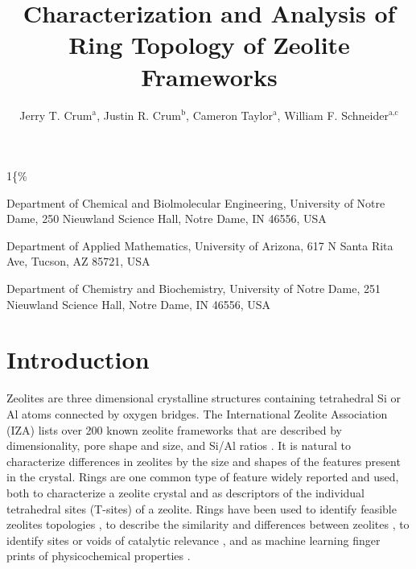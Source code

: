 \documentclass[11pt]{article}
\author{Jerry T. Crum\(^{\text{a}}\), Justin R. Crum\(^{\text{b}}\), Cameron Taylor\(^{\text{a}}\), William F. Schneider\(^{\text{a,c}}\)}
\date{}
\title{Characterization and Analysis of Ring Topology of Zeolite Frameworks}
\begin{document}
\begin{OPTIONS}
\def\udesoftecoverride\#1\mainmatter\{\%
  \AfterEndPreamble{#1\mainmatter}
\end{OPTIONS}

\maketitle

\begin{asparaenum}[\expandafter\textsuperscript a ]
\item Department of Chemical and Biolmolecular Engineering, University of Notre Dame, 250 Nieuwland Science Hall, Notre Dame, IN 46556, USA \\
\item Department of Applied Mathematics, University of Arizona, 617 N Santa Rita Ave, Tucson, AZ 85721, USA\\
\item Department of Chemistry and Biochemistry, University of Notre Dame, 251 Nieuwland Science Hall, Notre Dame, IN 46556, USA
\end{asparaenum}

\newpage

\section{Introduction}
\label{sec:orgb31d910}
Zeolites are three dimensional crystalline structures containing tetrahedral Si or Al atoms connected by oxygen bridges. The International Zeolite Association (IZA) lists over 200 known zeolite frameworks that are described by dimensionality, pore shape and size, and Si/Al ratios \cite{baerlocher-database-nodate}. It is natural to characterize differences in zeolites by the size and shapes of the features present in the crystal. Rings are one common type of feature widely reported and used, both to characterize a zeolite crystal and as descriptors of the individual tetrahedral sites (T-sites) of a zeolite. Rings have been used to identify feasible zeolites topologies \cite{li-why-2014}, to describe the similarity and differences between zeolites \cite{curtis-statistical-2003,bermudez-calculation-2017}, to identify sites or voids of catalytic relevance \cite{li-first-principles-2018,kester-effects-2021}, and as machine learning finger prints of physicochemical properties \cite{helfrecht-new-2019}. 
\end{document}
